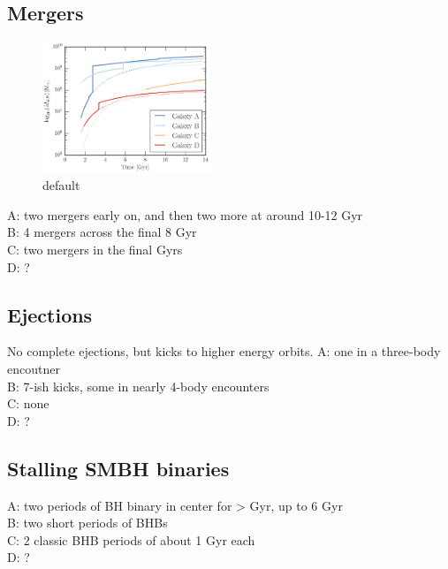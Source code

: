 \documentclass[english, apj]{emulateapj}
\begin{document}
\subsection{Mergers}
\begin{figure}[htbp]
\begin{center}
\includegraphics[width=0.45\textwidth]{plots/masses_ABCD.png}
\caption{default}
\label{default}
\end{center}
\end{figure}

\noindent A: two mergers early on, and then two more at around 10-12 Gyr\\
B: 4 mergers across the final 8 Gyr\\
C: two mergers in the final Gyrs\\
D: ?\\


\subsection{Ejections}
No complete ejections, but kicks to higher energy orbits.
\noindent A: one in a three-body encoutner\\
B: 7-ish kicks, some in nearly 4-body encounters\\
C: none\\
D: ?\\

\subsection{Stalling SMBH binaries}
A: two periods of BH binary in center for > Gyr, up to 6 Gyr\\
B: two short periods of BHBs\\
C: 2 classic BHB periods of about 1 Gyr each\\
D: ?
\end{document}
